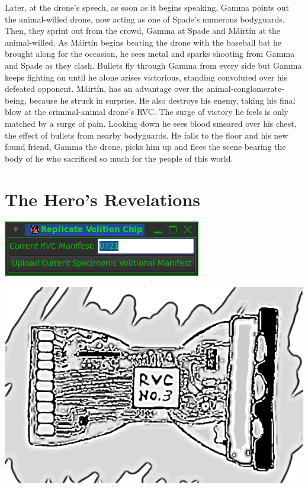 \documentclass[12pt]{article}
\newcommand{\mc}{M\'airt\'in}
\newcommand{\mcs}{M\'airt\'in }
\begin{document}
\begin{flushleft}
Later, at the drone's speech, as soon as it begins speaking, Gamma points out the animal-willed drone, now acting
as one of Spade's numerous bodyguards. Then, they sprint out from the crowd,
Gamma at Spade and \mcs at the animal-willed. As \mcs begins beating the drone with the baseball bat he brought along for the
occasion, he sees metal and sparks shooting from Gamma and Spade as they clash. Bullets fly through Gamma from every side
but Gamma keeps fighting on until he alone arises victorious, standing convoluted over his defeated opponent. \mc, has an advantage over
the animal-conglomerate-being, because he struck in surprise. He also destroys his enemy, taking his final blow at
the criminal-animal drone's RVC. The surge of victory he feels is only matched by
a surge of pain. Looking down he sees blood smeared over his chest, the effect of bullets from nearby bodyguards. He falls to the
floor and his new found friend, Gamma the drone, picks him up and flees the scene bearing the body of he who sacrificed
so much for the people of this world.


\section{The Hero's Revelations}

\noindent  \includegraphics[scale=0.5]{RVCWindow.png} \\
\newline

\noindent  \includegraphics[scale=0.75]{RVC_BAW.png} \\
\newline


\end{flushleft}
\end{document}
